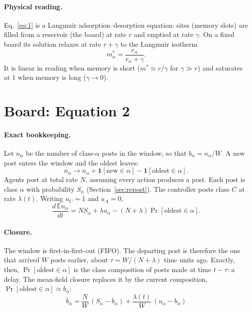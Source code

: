 \documentclass[10pt,a4paper]{article}
\theoremstyle{definition}
\newcommand{\E}{\mathbb E}
\begin{document}
\paragraph{Physical reading.} Eq.~\eqref{eq:1} is a Langmuir adsorption--desorption equation: sites (memory slots) are
filled from a reservoir (the board) at rate $r$ and emptied at rate $\gamma$. On a fixed board its solution relaxes at
rate $r+\gamma$ to the Langmuir isotherm
\begin{equation}
m^*_\alpha=\frac{r_\alpha}{r_\alpha+\gamma}.\label{eq:langmuir}
\end{equation}
It is linear in reading when memory is short ($m^*\approx r/\gamma$ for $\gamma\gg r$) and saturates at 1 when memory is
long ($\gamma\to0$).

\section{Board: Equation 2}
\label{sec:board}
\paragraph{Exact bookkeeping.} Let $n_\alpha$ be the number of class-$\alpha$ posts in the window, so that
$b_\alpha=n_\alpha/W$. A new post enters the window and the oldest leaves:
\begin{equation}
n_\alpha\to n_\alpha+\mathbf 1[\text{new}\in\alpha]-\mathbf 1[\text{oldest}\in\alpha].
\end{equation}
Agents post at total rate $N$, assuming every action produces a post. Each post is class $\alpha$ with probability
$S_\alpha$ (Section~\ref{sec:repost}). The controller posts class $C$ at rate $\lambda(t)$. Writing $u_C=1$ and $u_A=0$,
\begin{equation}
\frac{d\,\E n_\alpha}{dt}=N S_\alpha+\lambda u_\alpha-(N+\lambda)\Pr[\text{oldest}\in\alpha].\label{eq:exactboard}
\end{equation}

\paragraph{Closure.} The window is first-in-first-out (FIFO). The departing post is therefore the one that arrived $W$
posts earlier, about $\tau=W/(N+\lambda)$ time units ago. Exactly, then, $\Pr[\text{oldest}\in\alpha]$ is the class
composition of posts made at time $t-\tau$: a delay. The mean-field closure replaces it by the current composition,
$\Pr[\text{oldest}\in\alpha]\approx b_\alpha$:
\begin{equation}
\boxed{\ \dot b_\alpha=\frac NW\,(S_\alpha-b_\alpha)+\frac{\lambda(t)}{W}\,(u_\alpha-b_\alpha)\ }\label{eq:2}
\end{equation}
\end{document}
